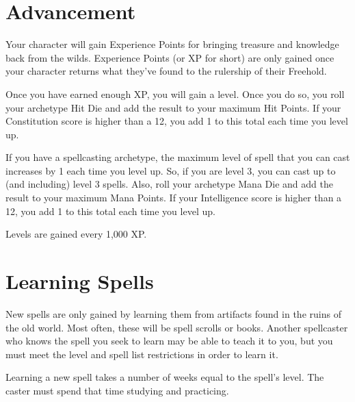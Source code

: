 \begin{multicols}{2}
\section{Advancement}

Your character will gain Experience Points for bringing treasure and knowledge
back from the wilds. Experience Points (or XP for short) are only gained once
your character returns what they've found to the rulership of their Freehold.

Once you have earned enough XP, you will gain a level. Once you do so, you roll
your archetype Hit Die and add the result to your maximum Hit Points. If your
Constitution score is higher than a 12, you add 1 to this total each time you
level up.

If you have a spellcasting archetype, the maximum level of spell that you can cast
increases by 1 each time you level up. So, if you are level 3, you can cast up
to (and including) level 3 spells. Also, roll your archetype Mana Die and add the
result to your maximum Mana Points. If your Intelligence score is higher than a
12, you add 1 to this total each time you level up.

Levels are gained every 1,000 XP.

\section{Learning Spells}

New spells are only gained by learning them from artifacts found in the ruins
of the old world. Most often, these will be spell scrolls or books. Another
spellcaster who knows the spell you seek to learn may be able to teach it to
you, but you must meet the level and spell list restrictions in order to
learn it.

Learning a new spell takes a number of weeks equal to the spell's level. The
caster must spend that time studying and practicing.

\end{multicols}
